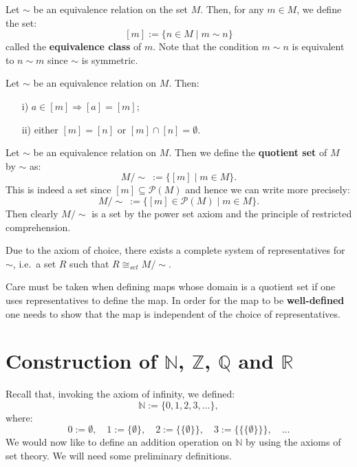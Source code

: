 \documentclass[root.tex]{subfiles}
\begin{document}
\begin{mydef}
Let $\sim$ be an equivalence relation on the set $M$. Then, for any $m \in M$, we define the set:
$$
[m] := \{n \in M \mid m \sim n\}
$$
called the \textbf{equivalence class} of $m$. Note that the condition $m \sim n$ is equivalent to $n \sim m$ since $\sim$ is symmetric.
\end{mydef}

\begin{proposition}
Let $\sim$ be an equivalence relation on $M$. Then:
\begin{enumerate}
\item[i)] $a \in [m] \Rightarrow [a]=[m]$;
\item[ii)] either $[m]=[n]$ or $[m] \cap [n] = \emptyset$.
\end{enumerate}
\end{proposition}

\begin{mydef}
Let $\sim$ be an equivalence relation on $M$. Then we define the \textbf{quotient set} of $M$ by $\sim$ as:
$$
M/\!\sim\ := \{[m]\mid m \in M\}.
$$
This is indeed a set since $[m]\subseteq\mathcal{P}(M)$ and hence we can write more precisely:
$$
M/\!\sim\ := \{[m]\in\mathcal{P}(M)\mid m \in M\}.
$$
Then clearly $M/\!\sim$ is a set by the power set axiom and the principle of restricted comprehension.
\end{mydef}

\begin{remark}
Due to the axiom of choice, there exists a complete system of representatives for $\sim$, i.e.\ a set $R$ such that $R \cong_{set} M/\!\sim$.
\end{remark}

\begin{remark}
Care must be taken when defining maps whose domain is a quotient set if one uses representatives to define the map. In order for the map to be \textbf{well-defined} one needs to show that the map is independent of the choice of representatives. 
\end{remark}


\section{\texorpdfstring{Construction of $\mathbb{N}$, $\mathbb{Z}$, $\mathbb{Q}$ and $\mathbb{R}$}{Construction of N, Z, Q and R}}%

 Recall that, invoking the axiom of infinity, we defined:
 $$
 \mathbb{N} := \{0,1,2,3,\ldots\},
 $$
 where:
 $$
 0 :=\emptyset , \quad 1  := \{\emptyset\},\quad 2:= \{\{\emptyset\}\}, \quad 3 := \{\{\{\emptyset\}\}\} , \quad \ldots
 $$
 We would now like to define an addition operation on $\mathbb{N}$ by using the axioms of set theory. We will need some preliminary definitions.
\end{document}
